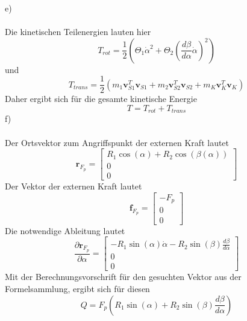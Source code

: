 e)\\ \\
Die kinetischen Teilenergien lauten hier
\[
	T_{rot} = \frac{1}{2}\left(\varTheta_1\dot{\alpha}^2 + \varTheta_2\left(\frac{d\beta}{d\alpha}\dot{\alpha}\right)^2\right)
\]
und 
\[
	T_{trans} = \frac{1}{2}(m_1\textbf{v}_{S1}^T\textbf{v}_{S1} + m_2\textbf{v}_{S2}^T\textbf{v}_{S2} + m_K\textbf{v}_K^T\textbf{v}_K)
\]
Daher ergibt sich für die gesamte kinetische Energie
\[
	T = T_{rot} + T_{trans}
\]
f)\\ \\
Der Ortsvektor zum Angriffspunkt der externen Kraft lautet
\[
	\textbf{r}_{F_p} = \begin{bmatrix}
	R_1\cos(\alpha) + R_2\cos(\beta(\alpha)) \\
	0 \\
	0		
	\end{bmatrix}
\]
Der Vektor der externen Kraft lautet
\[
	\textbf{f}_{F_p} = \begin{bmatrix}
		-F_p \\
		0 \\
		0
	\end{bmatrix}
\]
Die notwendige Ableitung lautet
\[
	\frac{\partial\textbf{r}_{F_p} }{\partial \alpha} = \begin{bmatrix}
	-R_1\sin(\alpha)\dot{\alpha} - R_2\sin(\beta)\frac{d\beta}{d\alpha} \\
	0 \\
	0
	\end{bmatrix}
\]
Mit der Berechnungsvorschrift für den gesuchten Vektor aus der Formelsammlung, ergibt sich für diesen
\[
	Q = F_p\left(R_1\sin(\alpha) + R_2\sin(\beta)\frac{d\beta}{d\alpha}\right) 
\]